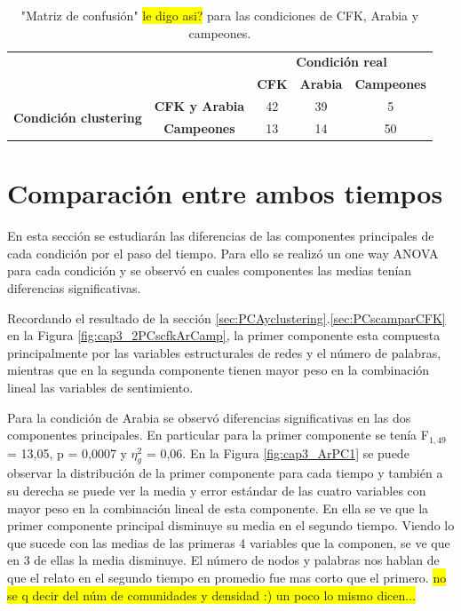 \begin{table}[htbp]
    \centering
    \begin{tabular}{|l|c|c|c|c|}
        \cline{3-5}
        \multicolumn{2}{c|}{} & \multicolumn{3}{c|}{\textbf{Condición real}} \\
        \cline{3-5}
        \multicolumn{1}{c}{} & & \textbf{CFK} & \textbf{Arabia} & \textbf{Campeones} \\
        \hline
        \multirow{2}{*}{\textbf{Condición clustering}} & \textbf{CFK y Arabia} & 42 & 39 & 5 \\
        \cline{2-5}
        & \textbf{Campeones} & 13 & 14 & 50 \\
        \hline
    \end{tabular}
    \caption{"Matriz de confusión" \colorbox{yellow}{le digo asi?} para las condiciones de CFK, Arabia y campeones.}
    \label{tab:confusion_matrix_CFKARcamp_2t}
\end{table}


\section{Comparación entre ambos tiempos}

En esta sección se estudiarán las diferencias de las componentes principales de cada condición por el paso del tiempo. Para ello se realizó un one way ANOVA para cada condición y se observó en cuales componentes las medias tenían diferencias significativas.

Recordando el resultado de la sección \ref{sec:PCAyclustering}.\ref{sec:PCscamparCFK} en la Figura \ref{fig:cap3_2PCscfkArCamp}, la primer componente esta compuesta principalmente por las variables estructurales de redes y el número de palabras, mientras que en la segunda componente tienen mayor peso en la combinación lineal las variables de sentimiento.

Para la condición de Arabia se observó diferencias significativas en las dos componentes principales. En particular para la primer componente se tenía F$_{1,49}$ = 13,05, p = 0,0007 y $\eta_g^2$ = 0,06. En la Figura \ref{fig:cap3_ArPC1} se puede observar la distribución de la primer componente para cada tiempo y también a su derecha se puede ver la media y error estándar de las cuatro variables con mayor peso en la combinación lineal de esta componente. En ella se ve que la primer componente principal disminuye su media en el segundo tiempo. Viendo lo que sucede con las medias de las primeras 4 variables que la componen, se ve que en 3 de ellas la media disminuye. El número de nodos y palabras nos hablan de que el relato en el segundo tiempo en promedio fue mas corto que el primero. \colorbox{yellow}{no se q decir del núm de comunidades y densidad :) un poco lo mismo dicen...}


